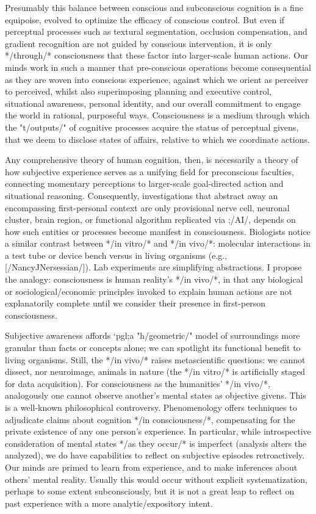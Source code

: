 Presumably this balance between conscious and subconscious 
cognition is a fine equipoise, evolved to optimize the 
efficacy of conscious control.  But even if perceptual 
processes such as textural segmentation, occlusion compensation, 
and gradient recognition are not guided by conscious 
intervention, it is only */through/* consciousness 
that these factor into larger-scale 
human actions.  Our minds work in such a manner  
that pre-conscious operations become consequential  
as they are woven into conscious experience, 
against which we orient as perceiver to perceived, 
whilst also superimposing planning and executive 
control, situational awareness, personal identity, 
and our overall commitment to engage the world 
in rational, purposeful ways.  Consciousness 
is a medium through which the 
"t/outputs/" of cognitive processes acquire the status 
of perceptual givens, that we deem to disclose  
states of affairs, relative to which we coordinate actions.

Any comprehensive theory of human cognition, then, is necessarily a 
theory of how subjective experience serves as a unifying 
field for preconscious faculties, connecting momentary 
perceptions to larger-scale goal-directed action and 
situational reasoning.  Consequently, investigations 
that abstract away an encompassing first-personal context 
are only provisional %
nerve cell, neuronal cluster, brain region, or 
functional algorithm replicated via ;/AI/, depends on 
how such entities or processes become manifest in 
consciousness.  Biologists notice a similar contrast 
between */in vitro/* and */in vivo/*: molecular 
interactions in a test tube or device bench versus 
in living organisms (e.g., [/NancyJNersessian/]).  Lab experiments 
are simplifying abstractions.  I propose 
the analogy: consciousness is human reality's */in vivo/*, 
in that any biological or sociological/economic 
principles invoked to explain human actions are not explanatorily 
complete until we consider their presence in 
first-person consciousness.

Subjective awareness affords `pgl;a "h/geometric/" model 
of surroundings more granular than facts or concepts 
alone; we can spotlight its functional benefit
to living organisms.  Still, the */in vivo/* raises 
metascientific questions: we cannot dissect, nor neuroimage, animals in 
nature (the */in vitro/* is artificially 
staged for data acquisition).  For 
consciousness as the humanities' */in vivo/*, analogously one 
cannot observe another's mental states as objective givens.  
This is a well-known philosophical controversy.  Phenomenology 
offers techniques to adjudicate claims about cognition 
*/in consciousness/*, compensating for the private existence 
of any one person's experience.  In particular, while introspective 
consideration of mental states */as they occur/* is imperfect 
(analysis alters the analyzed), we do have capabilities to 
reflect on subjective episodes retroactively.  Our minds are primed to learn 
from experience, and to make inferences about others' 
mental reality.  Usually this would occur 
without explicit systematization, perhaps to some 
extent subconsciously, but it is not a great leap 
to reflect on past experience with a more 
analytic/expository intent.

